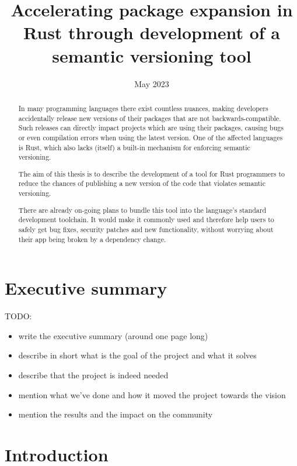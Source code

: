 \documentclass[licencjacka,en]{pracamgr}
\date{May 2023}
\title{Accelerating package expansion in Rust through development of a semantic versioning tool}
\begin{document}
\maketitle

\begin{abstract}
In many programming languages there exist countless nuances,
making developers accidentally release new versions of their packages
that are not backwards-compatible.
Such releases can directly impact projects which are using their packages,
causing bugs or even compilation errors when using the latest version.
One of the affected languages is Rust,
which also lacks (itself) a built-in mechanism for enforcing semantic versioning.

The aim of this thesis is to describe the development of a tool
for Rust programmers to reduce the chances of publishing
a new version of the code that violates semantic versioning.

There are already on-going plans to bundle this tool
into the language's standard development toolchain.
It would make it commonly used and therefore help users to safely get bug fixes,
security patches and new functionality,
without worrying about their app being broken by a dependency change.
\end{abstract}

\tableofcontents

\chapter*{Executive summary}

TODO:
\begin{itemize}
	\item write the executive summary (around one page long)
	\item describe in short what is the goal of the project and what it solves
	\item describe that the project is indeed needed
	\item mention what we've done and how it moved the project towards the vision
	\item mention the results and the impact on the community
\end{itemize}

\chapter*{Introduction}
\end{document}
